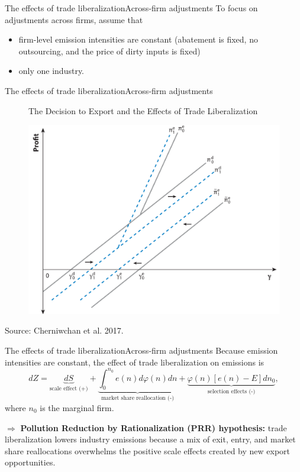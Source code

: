 \documentclass{beamer}
\begin{document}
\begin{frame}{The effects of trade liberalization}{Across-firm adjustments}
	To focus on adjustments across firms, assume that
	\begin{itemize}
		\item firm-level emission intensities are constant (abatement is fixed, no outsourcing, and the price of dirty inputs is fixed)
		\item only one industry.
	\end{itemize}
\end{frame}
\begin{frame}{The effects of trade liberalization}{Across-firm adjustments}
	\begin{figure}[h]
		\centering
		The Decision to Export and the Effects of Trade Liberalization

		\includegraphics[scale=0.25]{figure2.png}
	\end{figure}
	Source: Cherniwchan et al. 2017.
\end{frame}
\begin{frame}{The effects of trade liberalization}{Across-firm adjustments}
	Because emission intensities are constant, the effect of trade liberalization on emissions is
	\begin{equation}
		dZ=\underbrace{dS}_{\text{scale effect (+)}} + \underbrace{\int_0^{n_0}e(n)d\varphi(n)dn}_{\text{market share
		reallocation (-)}} + \underbrace{\varphi(n)[e(n)-E]dn_0}_{\text{selection effects (-)}},
	\end{equation}
	where $n_0$ is the marginal firm.
	\medskip

	$\Rightarrow$ \textbf{Pollution Reduction by Rationalization (PRR) hypothesis:} trade liberalization lowers industry emissions because a mix of exit, entry, and market share reallocations overwhelms the positive scale effects
	created by new export opportunities.
\end{frame}
\end{document}
